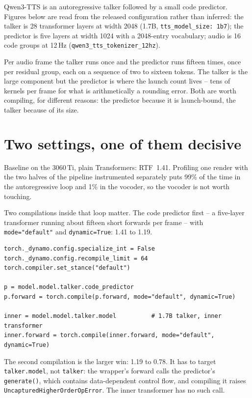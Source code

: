 \documentclass[11pt]{article}
\begin{document}
Qwen3-TTS \cite{qwencard} is an autoregressive talker followed by a small code predictor. Figures below are read from the released
configuration rather than inferred: the talker is 28 transformer layers at width 2048 (1.7B, \texttt{tts\_model\_size:
1b7}); the predictor is five layers at width 1024 with a 2048-entry vocabulary; audio is 16 code groups at 12\,Hz
(\texttt{qwen3\_tts\_tokenizer\_12hz}).

Per audio frame the talker runs once and the predictor runs fifteen times, once per residual group, each on a
sequence of two to sixteen tokens. The talker is the large component but the predictor is where the launch count
lives -- tens of kernels per frame for what is arithmetically a rounding error. Both are worth compiling, for
different reasons: the predictor because it is launch-bound, the talker because of its size.

\section{Two settings, one of them decisive}

Baseline on the 3060\,Ti, plain Transformers: RTF~1.41. Profiling one render with the two halves of the pipeline
instrumented separately puts 99\% of the time in the autoregressive loop and 1\% in the vocoder, so the vocoder is
not worth touching.

Two compilations inside that loop matter. The code predictor first -- a five-layer transformer running about fifteen
short forwards per frame -- with \texttt{mode="default"} and \texttt{dynamic=True}: 1.41 to 1.19.

\begin{verbatim}
torch._dynamo.config.specialize_int = False
torch._dynamo.config.recompile_limit = 64
torch.compiler.set_stance("default")

p = model.model.talker.code_predictor
p.forward = torch.compile(p.forward, mode="default", dynamic=True)

inner = model.model.talker.model          # 1.7B talker, inner transformer
inner.forward = torch.compile(inner.forward, mode="default", dynamic=True)
\end{verbatim}

The second compilation is the larger win: 1.19 to 0.78. It has to target \texttt{talker.model}, not
\texttt{talker}: the wrapper's forward calls the predictor's \texttt{generate()}, which contains data-dependent
control flow, and compiling it raises \texttt{UncapturedHigherOrderOpError}. The inner transformer has no such call.
\end{document}
